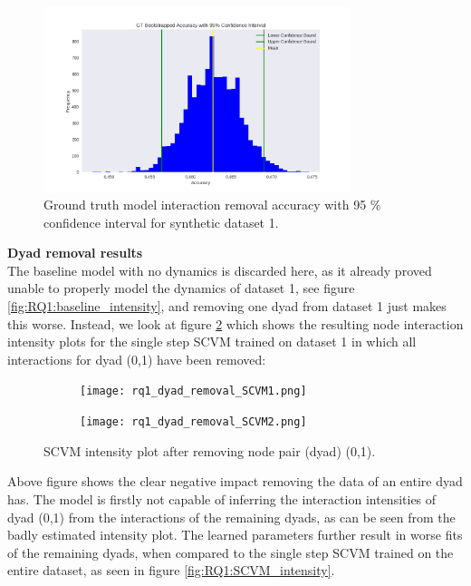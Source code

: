 \begin{figure}[H]
    \centering
    \includegraphics[width=0.8\textwidth]{0_images/rq1_GT_accuracy_SCVM.png}
    \caption{Ground truth model interaction removal accuracy with 95 \% confidence interval for synthetic dataset 1.}
    \label{fig:RQ1:baseline_accuracy}
\end{figure}

\clearpage
\noindent
\textbf{Dyad removal results}
\\
The baseline model with no dynamics is discarded here, as it already proved unable to properly model the dynamics of dataset 1, see figure \ref{fig:RQ1:baseline_intensity}, and removing one dyad from dataset 1 just makes this worse. 
Instead, we look at figure \ref{fig:RQ1:SCVM_dyadremoval} which shows the resulting node interaction intensity plots for the single step SCVM trained on dataset 1 in which all interactions for dyad (0,1) have been removed:
\begin{figure}[H]
    \centering
    \begin{subfigure}[b]{\textwidth}
        \centering
        \texttt{[image: rq1\_dyad\_removal\_SCVM1.png]}
    \end{subfigure}
    \hfill
    \begin{subfigure}[b]{\textwidth}
        \centering
        \texttt{[image: rq1\_dyad\_removal\_SCVM2.png]}
    \end{subfigure}
        \caption{SCVM intensity plot after removing node pair (dyad) (0,1).}
    \label{fig:RQ1:SCVM_dyadremoval}
\end{figure}
\noindent
Above figure shows the clear negative impact removing the data of an entire dyad has.
The model is firstly not capable of inferring the interaction intensities of dyad (0,1) from the interactions of the remaining dyads, as can be seen from the badly estimated intensity plot.
The learned parameters further result in worse fits of the remaining dyads, when compared to the single step SCVM trained on the entire dataset, as seen in figure \ref{fig:RQ1:SCVM_intensity}.





